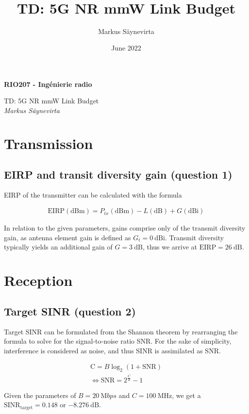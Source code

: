 \documentclass{article}
\title{TD: 5G NR mmW Link Budget}
\author{Markus Säynevirta}
\date{June 2022}
\begin{document}
\thispagestyle{plain}

\large
\textbf{RIO207 - Ingénierie radio}

\large
TD: 5G NR mmW Link Budget\\
\textit{Markus Säynevirta}
\vspace{0.5cm}

\section{Transmission}
\subsection{EIRP and transit diversity gain (question 1)}

EIRP of the transmitter can be calculated with the formula 

\begin{align*}
     \mathrm{EIRP(dBm)} = P_{tx}\mathrm{(dBm)} - L\mathrm{(dB)} + G\mathrm{(dBi)}
\end{align*}

In relation to the given parameters, gains comprise only of the transmit diversity gain, as antenna element gain is defined as \(G_t = 0\ \mathrm{dBi}\). Transmit diversity typically yields an additional gain of \(G =3\ \mathrm{dB}\), thus we arrive at \(\mathrm{EIRP} = 26\ \mathrm{dB}\).

\section{Reception}
\subsection{Target SINR (question 2)}

Target SINR can be formulated from the Shannon theorem by rearranging the formula to solve for the signal-to-noise ratio SNR. For the sake of simplicity, interference is considered as noise, and thus SINR is assimilated as SNR.

\begin{gather*}
     \mathrm{C} = B\log_2 (1+\mathrm{SNR}) \\
     \Leftrightarrow \mathrm{SNR} = 2^{\frac{C}{B}} - 1
\end{gather*}

Given the parameters of \(B = \SI{20}{\mega bps}\) and \(C = \SI{100}{\mega\hertz}\), we get a \(\mathrm{SINR_{target}} = 0.148\) or \(\SI{-8.276}{\deci\bel}\).
\end{document}
